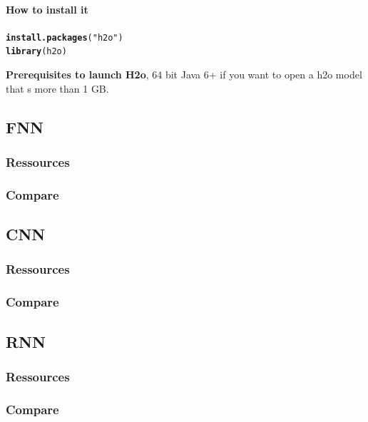 \documentclass[6pt,letter]{article}\usepackage[]{graphicx}\usepackage[]{color}
\makeatletter
\newcommand{\hlstr}[1]{\textcolor[rgb]{0.192,0.494,0.8}{#1}}%
\newcommand{\hlstd}[1]{\textcolor[rgb]{0.345,0.345,0.345}{#1}}%
\newcommand{\hlkwd}[1]{\textcolor[rgb]{0.737,0.353,0.396}{\textbf{#1}}}%
\newenvironment{kframe}{%
 \def\at@end@of@kframe{}%
 \ifinner\ifhmode%
  \def\at@end@of@kframe{\end{minipage}}%
  \begin{minipage}{\columnwidth}%
 \fi\fi%
 \def\FrameCommand##1{\hskip\@totalleftmargin \hskip-\fboxsep
 \colorbox{shadecolor}{##1}\hskip-\fboxsep
     \hskip-\linewidth \hskip-\@totalleftmargin \hskip\columnwidth}%
 \MakeFramed {\advance\hsize-\width
   \@totalleftmargin\z@ \linewidth\hsize
   \@setminipage}}%
 {\par\unskip\endMakeFramed%
 \at@end@of@kframe}
\newenvironment{knitrout}{}{} %
\makeatother
\begin{document}
\paragraph{How to install it}
\begin{knitrout}
\color{fgcolor}\begin{kframe}
\begin{alltt}
\hlkwd{install.packages}\hlstd{(}\hlstr{"h2o"}\hlstd{)}
\hlkwd{library}\hlstd{(h2o)}
\end{alltt}
\end{kframe}
\end{knitrout}
\textbf{Prerequisites to launch H2o}, 64 bit Java 6+ if you want to open a h2o model that s more than 1 GB. 
\subsection{FNN}
\subsubsection{Ressources}

\subsubsection{Compare}

\subsection{CNN}
\subsubsection{Ressources}
\subsubsection{Compare}

\subsection{RNN}
\subsubsection{Ressources}
\subsubsection{Compare}

\newpage
\pagestyle{plain}

\end{document}
